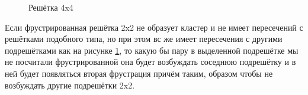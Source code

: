 \documentclass[utf8, babel, sor, jor, amsmath, amssymb, reprint]{elsarticle} %
\begin{document}
\begin{figure}[h]
	\centering
	\caption{Решётка 4x4}
	\label{fig:4x4}
\end{figure}

Если фрустрированная решётка 2x2 не образует кластер и не имеет пересечений с решётками подобного типа, но при этом вс же имеет пересечения с другими подрешётками как на  рисунке \ref{fig:4x4}, то какую бы пару в выделенной подрешётке мы не посчитали фрустрированной она будет возбуждать соседнюю подрешётку и в ней будет появляться вторая фрустрация причём таким, образом чтобы не возбуждать другие подрешётки 2x2. 
\end{document}
